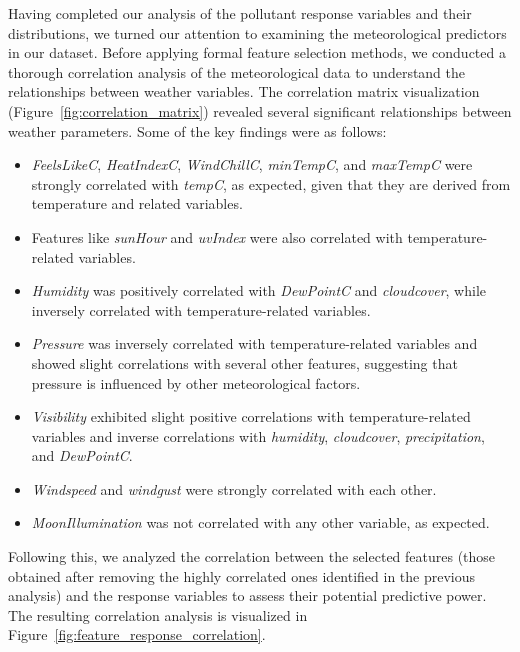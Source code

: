 \documentclass[twoside,11pt]{article}
\begin{document}
Having completed our analysis of the pollutant response variables and their distributions, we turned our attention to examining the meteorological predictors in our dataset. Before applying formal feature selection methods, we conducted a thorough correlation analysis of the meteorological data to understand the relationships between weather variables. The correlation matrix visualization (Figure~\ref{fig:correlation_matrix}) revealed several significant relationships between weather parameters. Some of the key findings were as follows:

\begin{itemize}
    \item \textit{FeelsLikeC}, \textit{HeatIndexC}, \textit{WindChillC}, \textit{minTempC}, and \textit{maxTempC} were strongly correlated with \textit{tempC}, as expected, given that they are derived from temperature and related variables.
    \item Features like \textit{sunHour} and \textit{uvIndex} were also correlated with temperature-related variables.
    \item \textit{Humidity} was positively correlated with \textit{DewPointC} and \textit{cloudcover}, while inversely correlated with temperature-related variables.
    \item \textit{Pressure} was inversely correlated with temperature-related variables and showed slight correlations with several other features, suggesting that pressure is influenced by other meteorological factors.
    \item \textit{Visibility} exhibited slight positive correlations with temperature-related variables and inverse correlations with \textit{humidity}, \textit{cloudcover}, \textit{precipitation}, and \textit{DewPointC}.
    \item \textit{Windspeed} and \textit{windgust} were strongly correlated with each other.
    \item \textit{MoonIllumination} was not correlated with any other variable, as expected.
\end{itemize}

Following this, we analyzed the correlation between the selected features (those obtained after removing the highly correlated ones identified in the previous analysis) and the response variables to assess their potential predictive power. The resulting correlation analysis is visualized in Figure~\ref{fig:feature_response_correlation}.
\end{document}
